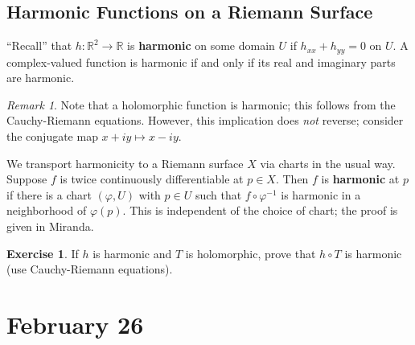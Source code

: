 \documentclass[12pt]{article}
\newcommand{\real}{\mathbb{R}}
\newcommand{\ita}[1]{\textit{#1}}
\newcommand\inv[1]{#1^{-1}}
\theoremstyle{definition}
\newtheorem{exercise}{Exercise}
\theoremstyle{remark}
\newtheorem*{remark}{Remark}
\begin{document}
\subsection{Harmonic Functions on a Riemann Surface}
``Recall'' that $h : \real^2 \to \real$ is \textbf{harmonic} on some domain $U$ if $h_{xx} + h_{yy} = 0$ on $U$. A complex-valued function is harmonic if and only if its real and imaginary parts are harmonic.
\begin{remark}
    Note that a holomorphic function is harmonic; this follows from the Cauchy-Riemann equations. However, this implication does \ita{not} reverse; consider the conjugate map $x + iy \mapsto x - iy$.
\end{remark}
We transport harmonicity to a Riemann surface $X$ via charts in the usual way. Suppose $f$ is twice continuously differentiable at $p \in X$. Then $f$ is \textbf{harmonic} at $p$ if there is a chart $(\varphi , U)$ with $p \in U$ such that $f \circ \inv{\varphi}$ is harmonic in a neighborhood of $\varphi(p)$. This is independent of the choice of chart; the proof is given in Miranda.
\begin{exercise}
    If $h$ is harmonic and $T$ is holomorphic, prove that $h \circ T$ is harmonic (use Cauchy-Riemann equations).
\end{exercise}
\section{February 26}
\end{document}
